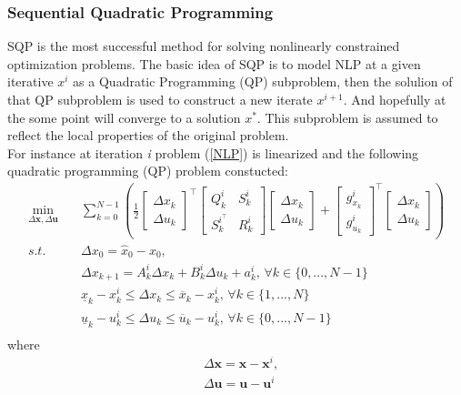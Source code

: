 \subsubsection{Sequential Quadratic Programming}
SQP is the most successful method for solving nonlinearly constrained optimization problems. The basic idea of SQP is to model 
NLP at a given iterative $x^i$ as a Quadratic Programming (QP) subproblem, then the solulion of that QP subproblem is used to construct  a new iterate $x^{i+1}$.  And hopefully at the some point will converge to a solution $x^{*}$. This subproblem is assumed to reflect the local properties of the original problem.\\
For instance at iteration \textit{i} problem (\ref{NLP}) is linearized and  the following quadratic programming (QP) problem constucted:
\begin{equation}\label{QP}
\begin{aligned}
\min_{\Delta \mathbf{x},\Delta \mathbf{u}} \quad & \sum_{k=0}^{N-1}( \frac{1}{2}
\begin{bmatrix}
\Delta x_k\\
\Delta u_k
\end{bmatrix}^\intercal \begin{bmatrix}
Q_k^i & S_k^i \\
S_k^{i^\top} & R_k^i
\end{bmatrix}
\begin{bmatrix}
\Delta x_k\\
\Delta u_k
\end{bmatrix} + \begin{bmatrix}
g_{x_k}^i\\
g_{u_k}^i
\end{bmatrix}^\intercal
\begin{bmatrix}
\Delta x_k\\
\Delta u_k
\end{bmatrix} ) \\
s.t. \quad & \Delta x_0=\hat{x}_0-x_0,\\
& \Delta x_{k+1}=A_{k}^i \Delta x_{k}+ B_{k}^i \Delta u_{k} +a_{k}^i, \,\forall k \in \{0,...,N-1\}\\
& \underline{x}_k - x_k^i\leq \Delta x_k\leq \overline{x}_k-x_k^i,\,\forall k \in \{1,...,N\}\\
& \underline{u}_k - u_k^i\leq \Delta u_k\leq\overline{u}_k-u_k^i,\,\forall k \in \{0,...,N-1\}\\
\end{aligned}
\end{equation}
where 
\begin{equation}
\begin{aligned}
&\Delta \mathbf{x}=\mathbf{x}-\mathbf{x}^i,\\
&\Delta \mathbf{u}=\mathbf{u}-\mathbf{u}^i
\end{aligned}
\end{equation}
